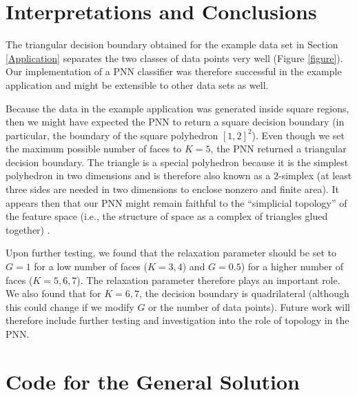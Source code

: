 \documentclass[12pt, a4paper, notitlepage]{report}
\renewcommand{\thesection}{\arabic{section}.  }
\begin{document}
\section{Interpretations and Conclusions}

The triangular decision boundary obtained for the example data set in Section \ref{Application} separates the two classes of data points very well (Figure \ref{figure}). Our implementation of a PNN classifier was therefore successful in the example application and might be extensible to other data sets as well.

Because the data in the example application was generated inside square regions, then we might have expected the PNN to return a square decision boundary (in particular, the boundary of the square polyhedron $[1, 2]^2$). Even though we set the maximum possible number of faces to $K=5$, the PNN returned a triangular decision boundary. The triangle is a special polyhedron because it is the simplest polyhedron in two dimensions and is therefore also known as a $2$-simplex (at least three sides are needed in two dimensions to enclose nonzero and finite area). It appears then that our PNN might remain faithful to the ``simplicial topology'' of the feature space (i.e., the structure of space as a complex of triangles glued together) \cite{Knisley}.

Upon further testing, we found that the relaxation parameter should be set to $G=1$ for a low number of faces ($K=3,4$) and $G=0.5$) for a higher number of faces ($K=5,6,7$). The relaxation parameter therefore plays an important role. We also found that for $K=6,7$, the decision boundary is quadrilateral (although this could change if we modify $G$ or the number of data points). Future work will therefore include further testing and investigation into the role of topology in the PNN.





\appendix
\renewcommand{\thesection}{A\arabic{section}.  }

\section{Code for the General Solution} \label{Code}


\end{document}
